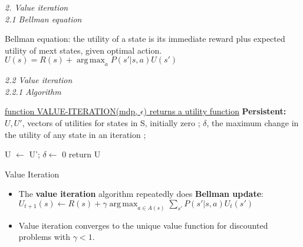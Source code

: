 \documentclass[12pt]{article}
\begin{document}
\noindent
\textsl{2. Value iteration}\\

\noindent
\textsl{2.1 Bellman equation}\\

\begin{tcolorbox}
Bellman equation: the utility of a state is its immediate reward plus expected utility of mext states, given optimal action. \\
$U(s) = R(s) + \operatorname*{arg\,max}_{a} P(s' | s, a)U(s') $
\end{tcolorbox}

\noindent
\textsl{2.2 Value iteration}\\

\noindent
\textsl{2.2.1 Algorithm}

\begin{algorithm}

    \underline{function VALUE-ITERATION(mdp, $\epsilon$) returns a utility function} \;
    \textbf{Persistent:} 
    {$U, U'$}, vectors of utilities for states in S, initially zero ; 
    $\delta$, the maximum change in the utility of any state in an iteration ; 
   
   {
      U $\gets$ U'; $\delta \gets$ 0 \;
         }
      return U
      \caption{Value Iteration}
\end{algorithm}

\begin{itemize}
\item The \textbf{value iteration} algorithm repeatedly does \textbf{Bellman update}:\\
$U_{t+1} (s) \gets R(s) + \gamma \operatorname*{arg\,max}_{a \in A(s)} \sum_{s'}{} P(s' | s, a) U_t(s')$
\item Value iteration converges to the unique value function for discounted problems with $\gamma < 1$.
\end{itemize}
\end{document}

